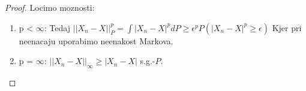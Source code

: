 \documentclass[a4paper,12pt]{article}
\theoremstyle{definition} %
\theoremstyle{plain} %
\begin{document}
        \begin{proof}
            Locimo moznosti:
            \begin{enumerate}
                \item p < $\infty$: Tedaj $||X_n - X||_P^p  = \int |X_n - X|^p dP \geq \epsilon^pP(|X_n - X|^p \geq \epsilon)$ Kjer pri neenacaju uporabimo neenakost Markova. 
                \item p = $\infty$: $||X_n - X||_\infty \geq |X_n - X|$ s.g.-$P$.
            \end{enumerate}
        \end{proof}
\end{document}
